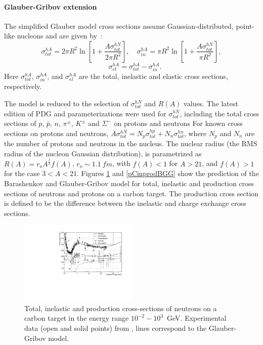 \paragraph{Glauber-Gribov extension}
The simplified Glauber model cross sections assume Gaussian-distributed,
point-like nucleons and are given by~\cite{hadbib:ggepjc,hadbib:ggnimb}:
\[
\sigma^{hA}_{tot}=2\pi R^2\ln\left[1+\frac{A\sigma^{hN}_{tot}}{2\pi R^2}\right],\quad
\sigma^{hA}_{in} = \pi R^2\ln\left[1+\frac{A\sigma^{hN}_{tot}}{\pi R^2}\right],
\]
\[
\quad \sigma^{hA}_{el}=\sigma^{hA}_{tot}-\sigma^{hA}_{in}.
\]
Here $\sigma^{hA}_{tot}$, $\sigma^{hA}_{in}$, and $\sigma^{hA}_{el}$ are the
total, inelastic and elastic cross sections, respectively. 

The model is reduced to the selection of $\sigma^{hN}_{tot}$ and $R(A)$
values.  The latest edition of PDG \cite{hadbib:PDG} and \Gfour{} parameterizations
were used for $\sigma^{hN}_{tot}$, including the total cross sections of $p$,
$\bar{p}$, $n$, $\pi^{\pm}$, $K^{\pm}$ and $\Sigma^{-}$ on protons and neutrons
For known cross sections on protons and neutrons,
$A\sigma^{hN}_{tot}=N_{p}\sigma^{hp}_{tot}+N_{n}\sigma^{hn}_{tot}$, where $N_{p}$
and $N_{n}$ are the number of protons and neutrons in the nucleus.
The nuclear radius (the RMS radius of the nucleon Gaussian distribution), 
is parametrized as $R(A) = r_{o}A^{\frac{1}{3}}f(A)$, 
$r_{o} \sim 1.1 \ fm$, with $f(A) < 1$ for $A > 21$, and $f(A) > 1$ for the  
case $3 < A < 21$. 
Figures \ref{nCtotinprodGG} and \ref{pCinprodBGG} show the prediction of the
Barashenkov and Glauber-Gribov model for total, inelastic and production cross
sections of neutrons and protons on a carbon target.  The production cross
section is defined to be the difference between the inelastic and charge 
exchange cross sections.  

\begin{figure}
\includegraphics[width=0.5\textwidth]{figures/nCtotinprodGG.pdf}
\caption{ Total, inelastic and production cross-sections of neutrons on a carbon 
target in the energy range $10^{-2}-10^3$~GeV. Experimental data (open and solid
points) from \cite{hadbib:ihepbase,hadbib:dubnabase}, lines correspond to the 
Glauber-Gribov model.}
\label{nCtotinprodGG}
\end{figure}

